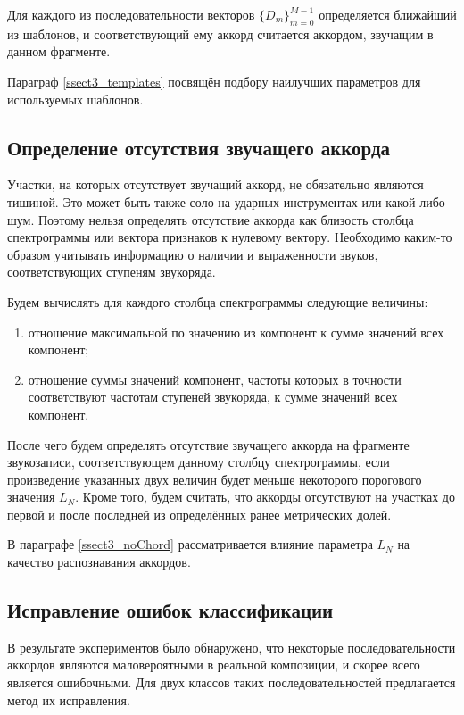 Для каждого из последовательности векторов $\{D_m\}_{m=0}^{M-1}$ определяется
ближайший из шаблонов, и соответствующий ему аккорд считается аккордом, звучащим
в данном фрагменте.

Параграф \ref{ssect3_templates} посвящён подбору наилучших параметров для
используемых шаблонов.

\subsection{Определение отсутствия звучащего аккорда} \label{ssect1_noChord}

Участки, на которых отсутствует звучащий аккорд, не обязательно являются
тишиной. Это может быть также соло на ударных инструментах или какой-либо шум.
Поэтому нельзя определять отсутствие аккорда как близость столбца спектрограммы
или вектора признаков к нулевому вектору. Необходимо каким-то образом учитывать
информацию о наличии и выраженности звуков, соответствующих ступеням звукоряда.

Будем вычислять для каждого столбца спектрограммы следующие величины:
\begin{enumerate}
  \item отношение максимальной по значению из компонент к сумме значений
  всех компонент;
  \item отношение суммы значений компонент, частоты которых в точности
  соответствуют частотам ступеней звукоряда, к сумме значений всех компонент.
\end{enumerate}
После чего будем определять отсутствие звучащего аккорда на фрагменте
звукозаписи, соответствующем данному столбцу спектрограммы, если произведение
указанных двух величин будет меньше некоторого порогового значения $L_{N}$.
Кроме того, будем считать, что аккорды отсутствуют на участках до первой и
после последней из определённых ранее метрических долей.

В параграфе \ref{ssect3_noChord} рассматривается влияние параметра $L_{N}$ на
качество распознавания аккордов.

\subsection{Исправление ошибок классификации} \label{ssect1_errcorr}

В результате экспериментов было обнаружено, что некоторые последовательности
аккордов являются маловероятными в реальной композиции, и скорее всего является
ошибочными. Для двух классов таких последовательностей предлагается метод их
исправления.

